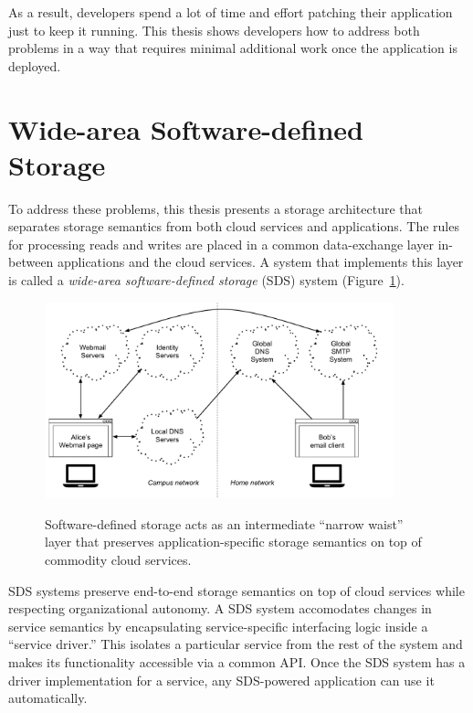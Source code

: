 As a result, developers spend a lot of time and effort patching their
application just to keep it running.  This thesis shows developers how to
address both problems in a way that requires minimal additional work once the
application is deployed.

\section{Wide-area Software-defined Storage}

To address these problems, this thesis presents a 
storage architecture that separates storage semantics
from both cloud services and applications.  The rules for processing reads and writes
are placed in a common data-exchange
layer in-between applications and the cloud services.  A system that
implements this layer is called a \emph{wide-area software-defined storage} (SDS) system
(Figure~\ref{fig:chap1-sds-overview}).

\begin{figure}[h]
   \caption{Software-defined storage acts as an intermediate ``narrow waist''
   layer that preserves application-specific storage semantics on top of
   commodity cloud services.}
   \centering
   \includegraphics[width=0.9\textwidth,page=28]{figures/dissertation-figures}
   \label{fig:chap1-sds-overview}
\end{figure}

SDS systems preserve
end-to-end storage semantics on top of cloud services while respecting
organizational autonomy.  A SDS system accomodates changes in service semantics
by encapsulating service-specific interfacing logic inside a ``service driver.''  This
isolates a particular service from the rest of the
system and makes its functionality accessible via a common API.  Once the SDS system has a
driver implementation for a service, any SDS-powered application can use it
automatically.

